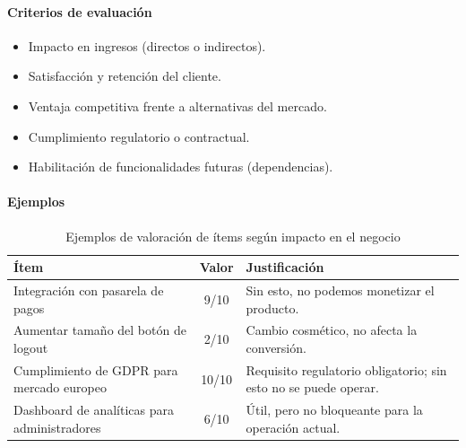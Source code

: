 \paragraph{Criterios de evaluación}

\begin{itemize}
    \item Impacto en ingresos (directos o indirectos).
    \item Satisfacción y retención del cliente.
    \item Ventaja competitiva frente a alternativas del mercado.
    \item Cumplimiento regulatorio o contractual.
    \item Habilitación de funcionalidades futuras (dependencias).
\end{itemize}

\paragraph{Ejemplos}

\begin{table}[h]
    \centering
    \small
    \begin{tabularx}{\textwidth}{|X|c|X|}
        \hline
        \textbf{Ítem} & \textbf{Valor}                                                  & \textbf{Justificación} \\
        \hline
        Integración con pasarela de pagos
                      & 9/10
                      & Sin esto, no podemos monetizar el producto.                                              \\
        \hline
        Aumentar tamaño del botón de logout
                      & 2/10
                      & Cambio cosmético, no afecta la conversión.                                               \\
        \hline
        Cumplimiento de GDPR para mercado europeo
                      & 10/10
                      & Requisito regulatorio obligatorio; sin esto no se puede operar.                          \\
        \hline
        Dashboard de analíticas para administradores
                      & 6/10
                      & Útil, pero no bloqueante para la operación actual.                                       \\
        \hline
    \end{tabularx}
    \caption{Ejemplos de valoración de ítems según impacto en el negocio}
    \label{tab:ejemplos-valoracion}
\end{table}

